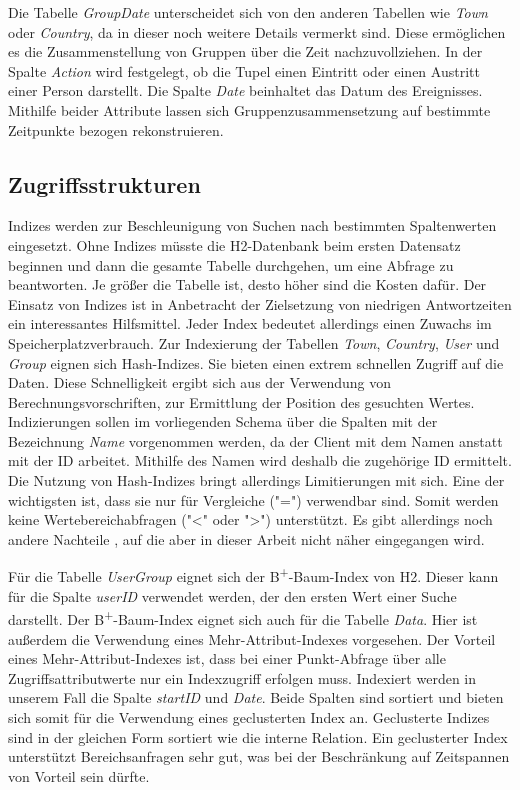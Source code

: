 Die Tabelle \textit{GroupDate} unterscheidet sich von den anderen Tabellen wie \textit{Town} oder \textit{Country}, da in dieser noch weitere Details vermerkt sind. Diese ermöglichen es die Zusammenstellung von Gruppen über die Zeit nachzuvollziehen. In der Spalte \textit{Action} wird festgelegt, ob die Tupel einen Eintritt oder einen Austritt einer Person darstellt. Die Spalte \textit{Date} beinhaltet das Datum des Ereignisses. Mithilfe beider Attribute lassen sich Gruppenzusammensetzung auf bestimmte Zeitpunkte bezogen rekonstruieren.

\subsection{Zugriffsstrukturen}

Indizes werden zur Beschleunigung von Suchen nach bestimmten Spaltenwerten eingesetzt. Ohne Indizes müsste die H2-Datenbank beim ersten Datensatz beginnen und dann die gesamte Tabelle durchgehen, um eine Abfrage zu beantworten. Je größer die Tabelle ist, desto höher sind die Kosten dafür. Der Einsatz von Indizes ist in Anbetracht der Zielsetzung von niedrigen Antwortzeiten ein interessantes Hilfsmittel. Jeder Index bedeutet allerdings einen Zuwachs im Speicherplatzverbrauch. Zur Indexierung der Tabellen \textit{Town}, \textit{Country}, \textit{User} und \textit{Group} eignen sich Hash-Indizes. Sie bieten einen extrem schnellen Zugriff auf die Daten. Diese Schnelligkeit ergibt sich aus der Verwendung von Berechnungsvorschriften, zur Ermittlung der Position des gesuchten Wertes. Indizierungen sollen im vorliegenden Schema über die Spalten mit der Bezeichnung \textit{Name} vorgenommen werden, da der Client mit dem Namen anstatt mit der ID arbeitet. Mithilfe des Namen wird deshalb die zugehörige ID ermittelt. Die Nutzung von Hash-Indizes bringt allerdings Limitierungen mit sich. Eine der wichtigsten ist, dass sie nur für Vergleiche ("=") verwendbar sind. Somit werden keine Wertebereichabfragen ("<" oder ">") unterstützt. Es gibt allerdings noch andere Nachteile \cite{SWB-352401869}, auf die aber in dieser Arbeit nicht näher eingegangen wird. 

Für die Tabelle \textit{UserGroup} eignet sich der B\textsuperscript{+}-Baum-Index von H2. Dieser kann für die Spalte \textit{userID} verwendet werden, der den ersten Wert einer Suche darstellt. Der B\textsuperscript{+}-Baum-Index eignet sich auch für die Tabelle \textit{Data}. Hier ist außerdem die Verwendung eines Mehr-Attribut-Indexes vorgesehen. Der Vorteil eines Mehr-Attribut-Indexes ist, dass bei einer Punkt-Abfrage über alle Zugriffsattributwerte nur ein Indexzugriff erfolgen muss. Indexiert werden in unserem Fall die Spalte \textit{startID} und \textit{Date}. Beide Spalten sind sortiert und bieten sich somit für die Verwendung eines geclusterten Index an. Geclusterte Indizes sind in der gleichen Form sortiert wie die interne Relation. Ein geclusterter Index unterstützt Bereichsanfragen sehr gut, was bei der Beschränkung auf Zeitspannen von Vorteil sein dürfte.       


